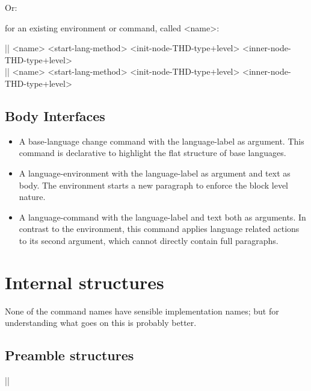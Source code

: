 \documentclass{ltxguide}
\begin{document}
Or:

for an existing environment or command, called <name>:

\begin{decl}
|\DeclareSREnvironment| <name> <start-lang-method>
    <init-node-THD-type+level> <inner-node-THD-type+level> \\
|\DeclareSRCommand| <name> <start-lang-method> <init-node-THD-type+level>
    <inner-node-THD-type+level>
\end{decl}



\subsection{Body Interfaces}

\begin{itemize}
\item
  A base-language change command with the language-label as
  argument.  This command is declarative to highlight the flat
  structure of base languages.

\item
  A language-environment with the language-label as argument and text
  as body.  The environment starts a new paragraph to enforce the block
  level nature.

\item
  A language-command with the language-label and text both as
  arguments. In contrast to the environment, this command applies
  language related actions to its second argument, which cannot
  directly contain full paragraphs.
\end{itemize}





\section{Internal structures}

None of the command names have sensible implementation names; but for
understanding what goes on this is probably better.

\subsection{Preamble structures}


\begin{decl}
|\usedlanguagecmds|
\end{decl}
\end{document}
